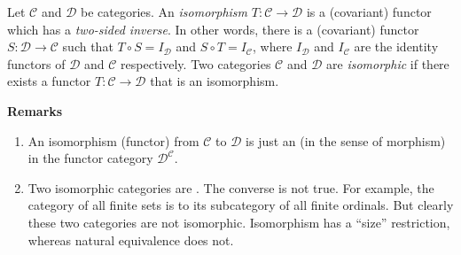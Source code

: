 \documentclass[12pt]{article}
\begin{document}
Let $\mathcal{C}$ and $\mathcal{D}$ be categories.  An
\emph{isomorphism} $T:\mathcal{C}\to\mathcal{D}$ is a (covariant)
functor which has a \emph{two-sided inverse}.  In other words, there
is a (covariant) functor $S:\mathcal{D}\to\mathcal{C}$ such that
$T\circ S=I_{\mathcal{D}}$ and $S\circ T=I_{\mathcal{C}}$, where
$I_{\mathcal{D}}$ and $I_{\mathcal{C}}$ are the identity functors of
$\mathcal{D}$ and $\mathcal{C}$ respectively.  Two categories
$\mathcal{C}$ and $\mathcal{D}$ are \emph{isomorphic} if there exists
a functor $T:\mathcal{C}\to\mathcal{D}$ that is an isomorphism.

\textbf{Remarks}
\begin{enumerate}
\item
An isomorphism (functor) from $\mathcal{C}$ to $\mathcal{D}$ is just
an  (in the sense of morphism)
in the functor category $\mathcal{D}^{\mathcal{C}}$.

\item
Two isomorphic categories are
.  The converse is not
true.  For example, the category of all finite sets is
 to its subcategory of all finite
ordinals.  But clearly these two categories are not isomorphic.
Isomorphism has a ``size'' restriction, whereas natural equivalence
does not.  
\end{enumerate}



\end{document}
